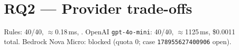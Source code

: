 \section{RQ2 --- Provider trade-offs}

Rules: 40/40, $\approx$0.18\,ms, . OpenAI \texttt{gpt-4o-mini}: 40/40, $\approx$1125\,ms, \$0.0011 total. Bedrock Nova Micro: blocked (quota 0; case \texttt{178955627400906} open).
